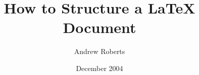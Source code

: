 \documentclass{resume}
\begin{document}
\title{How to Structure a LaTeX Document}
\author{Andrew Roberts}
\date{December 2004}
\maketitle
\end{document}
